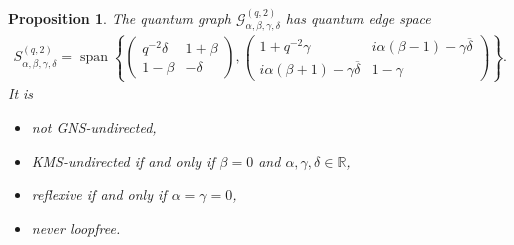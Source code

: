 \documentclass{amsart}
\newtheorem{proposition}[thm]{Proposition}
\newcommand{\R}{\mathbb{R}}
\DeclareMathOperator{\spann}{span}
\begin{document}
\begin{proposition}
\label{ntg::prop:qgraph_G_alpha,beta,gamma,delta_with_two_edges}
    The quantum graph $\mathcal{G}_{\alpha, \beta, \gamma, \delta}^{(q,2)}$ has quantum edge space
    \begin{align*}
        S_{\alpha, \beta, \gamma, \delta}^{(q,2)} = \spann \left\{
            \begin{pmatrix}
                q^{-2} \delta & 1+\beta \\
                1-\beta & - \delta
            \end{pmatrix},
            \begin{pmatrix}
                1+q^{-2} \gamma    & i\alpha(\beta-1)-\gamma\overline{\delta} \\
                i\alpha(\beta+1)-\gamma\overline{\delta} & 1-\gamma
            \end{pmatrix}
        \right\}.
    \end{align*}
    It is
    \begin{itemize}
        \item not GNS-undirected,
        \item KMS-undirected if and only if $\beta = 0$ and $\alpha, \gamma, \delta \in \R$,
        \item reflexive if and only if $\alpha = \gamma = 0$,
        \item never loopfree. 
    \end{itemize}
\end{proposition}
\end{document}
